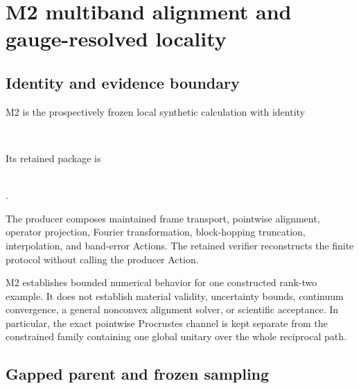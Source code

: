 \section{M2 multiband alignment and gauge-resolved locality}
\label{app:supp-m2}

\subsection{Identity and evidence boundary}

M2 is the prospectively frozen local synthetic calculation with identity
\begin{center}
 \small{}\\
\end{center}
Its retained package is
\begin{center}
 \small{}\\
 .
\end{center}
The producer composes maintained frame transport, pointwise alignment,
operator projection, Fourier transformation, block-hopping truncation,
interpolation, and band-error Actions. The retained verifier reconstructs the
finite protocol without calling the producer Action.

M2 establishes bounded numerical behavior for one constructed rank-two
example. It does not establish material validity, uncertainty bounds,
continuum convergence, a general nonconvex alignment solver, or scientific
acceptance. In particular, the exact pointwise Procrustes channel is kept
separate from the constrained family containing one global unitary over the
whole reciprocal path.

\subsection{Gapped parent and frozen sampling}

